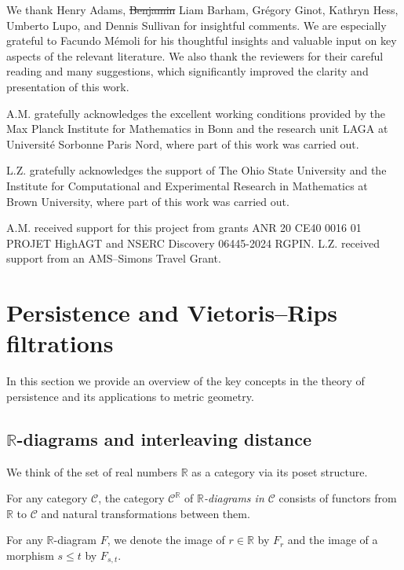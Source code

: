 \documentclass{amsart}
\makeatletter
\renewcommand\subsubsection{\@startsection{subsubsection}{3}
	\z@{.5\linespacing\@plus.7\linespacing}{0em}
	{\normalfont\itshape}}
\theoremstyle{definition}
\newcommand{\R}{\mathbb{R}}
\newcommand{\cC}{\mathcal{C}}
\newcommand{\darkblue}{\color{darkblue}}
\newcommand{\defn}[1]{{\darkblue \emph{#1}}}
\theoremstyle{theorem}
\providecommand{\DIFaddtex}[1]{{\protect\color{blue}\uwave{#1}}} %
\providecommand{\DIFdeltex}[1]{{\protect\color{red}\sout{#1}}}                      %
\providecommand{\DIFaddbegin}{} %
\providecommand{\DIFaddend}{} %
\providecommand{\DIFdelbegin}{} %
\providecommand{\DIFdelend}{} %
\providecommand{\DIFadd}[1]{\texorpdfstring{\DIFaddtex{#1}}{#1}} %
\providecommand{\DIFdel}[1]{\texorpdfstring{\DIFdeltex{#1}}{}} %
\newcommand{\DIFscaledelfig}{0.5}
\newlength{\DIFdelgraphicswidth} %
\newlength{\DIFdelgraphicsheight} %
\newcommand{\DIFaddincludegraphics}[2][]{{\color{blue}\fbox{\DIFOincludegraphics[#1]{#2}}}} %
\newcommand{\DIFdelincludegraphics}[2][]{%
\sbox{\DIFdelgraphicsbox}{\DIFOincludegraphics[#1]{#2}}%
\settoboxwidth{\DIFdelgraphicswidth}{\DIFdelgraphicsbox} %
\settoboxtotalheight{\DIFdelgraphicsheight}{\DIFdelgraphicsbox} %
\scalebox{\DIFscaledelfig}{%
\parbox[b]{\DIFdelgraphicswidth}{\usebox{\DIFdelgraphicsbox}\\[-\baselineskip] \rule{\DIFdelgraphicswidth}{0em}}\llap{\resizebox{\DIFdelgraphicswidth}{\DIFdelgraphicsheight}{%
\setlength{\unitlength}{\DIFdelgraphicswidth}%
\begin{picture}(1,1)%
\thicklines\linethickness{2pt} %
{\color[rgb]{1,0,0}\put(0,0){\framebox(1,1){}}}%
{\color[rgb]{1,0,0}\put(0,0){\line( 1,1){1}}}%
{\color[rgb]{1,0,0}\put(0,1){\line(1,-1){1}}}%
\end{picture}%
}\hspace*{3pt}}} %
} %
\DeclareRobustCommand{\DIFaddbegin}{\DIFOaddbegin \let\includegraphics\DIFaddincludegraphics} %
\DeclareRobustCommand{\DIFaddend}{\DIFOaddend \let\includegraphics\DIFOincludegraphics} %
\DeclareRobustCommand{\DIFdelbegin}{\DIFOdelbegin \let\includegraphics\DIFdelincludegraphics} %
\DeclareRobustCommand{\DIFdelend}{\DIFOaddend \let\includegraphics\DIFOincludegraphics} %
\renewcommand{\DIFadd}[1]{{\color{red}#1}}
\renewcommand{\DIFdel}[1]{{\color{deletedpurple}\ifmmode\oldmath{#1}\else\sout{#1}\fi}}
\newcommand{\oldmath}[1]{{\color{deletedpurple}\mathpalette\horizontalstrike{#1}}}
\newcommand{\horizontalstrike}[2]{\sbox0{$#1#2$}\rlap{\raisebox{.5\ht0}{\rule{\wd0}{.4pt}}}\usebox0}
\makeatother
\begin{document}
We thank Henry Adams, \DIFdelbegin \DIFdel{Benjamin }\DIFdelend \DIFaddbegin \DIFadd{Liam }\DIFaddend Barham, Gr\'egory Ginot, Kathryn Hess, Umberto Lupo, and Dennis Sullivan for insightful comments.
We are especially grateful to Facundo M\'{e}moli for his thoughtful insights and valuable input on key aspects of the relevant literature.
We also thank the reviewers for their careful reading and many suggestions, which significantly improved the clarity and presentation of this work.

A.M. gratefully acknowledges the excellent working conditions provided by the Max Planck Institute for Mathematics in Bonn and the research unit LAGA at Université Sorbonne Paris Nord, where part of this work was carried out.

L.Z. gratefully acknowledges the support of The Ohio State University and the Institute for Computational and Experimental Research in Mathematics at Brown University, where part of this work was carried out.

A.M. received support for this project from grants ANR 20 CE40 0016 01 PROJET HighAGT and NSERC Discovery 06445-2024 RGPIN.
L.Z. received support from an AMS--Simons Travel Grant.


	


\section{Persistence and Vietoris--Rips filtrations}

In this section we provide an overview of the key concepts in the theory of persistence and its applications to metric geometry.

\subsection{$\R$-diagrams and interleaving distance}

\subsubsection{}

We think of the set of real numbers $\R$ as a category via its poset structure.

For any category $\cC$, the category $\cC^\R$ of \defn{$\R$-diagrams in $\cC$} consists of functors from $\R$ to $\cC$ and natural transformations between them.

For any $\R$-diagram $F$, we denote the image of $r \in \R$ by $F_r$ and the image of a morphism $s \leq t$ by $F_{s,t}$.
\end{document}
